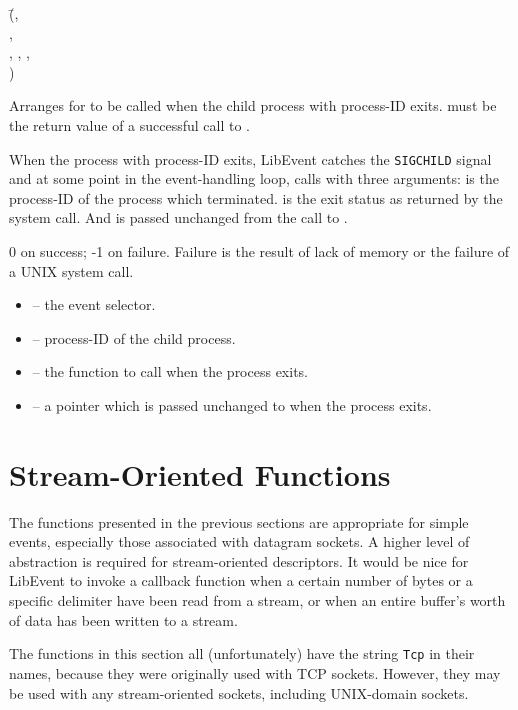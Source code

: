 \documentclass{article}
\newcommand{\Le}{\textsf{LibEvent}}
\begin{document}
{(\=,\\
  \> ,\\
  \> ,  , \type{)},\\
  \>)}
{Arranges for  to be called when the child process with
  process-ID  exits.   must be the return
  value of a successful call to .

  When the process with process-ID  exits, \Le{} catches
  the \texttt{SIGCHILD} signal and at some point in the event-handling
  loop, calls  with three arguments:   is
  the process-ID of the process which terminated.   is
  the exit status as returned by the  system call.  And
   is passed unchanged from the call to .}
{0 on success; -1 on failure.  Failure is the result of lack of memory or
  the failure of a UNIX system call.}
\begin{itemize}
\item {} -- the event selector.
\item {} -- process-ID of the child process.
\item {} -- the function to call when the process exits.
\item {} -- a pointer which is passed unchanged to 
  when the process exits.
\end{itemize}

\section{Stream-Oriented Functions}

The functions presented in the previous sections are appropriate for
simple events, especially those associated with datagram sockets.  A
higher level of abstraction is required for stream-oriented descriptors.
It would be nice for \Le{} to invoke a callback function when a certain
number of bytes or a specific delimiter have been read from a stream,
or when an entire buffer's worth of data has been written to a stream.

The functions in this section all (unfortunately) have the string
\texttt{Tcp} in their names, because they were originally used with TCP
sockets.  However, they may be used with any stream-oriented sockets,
including UNIX-domain sockets.
\end{document}
